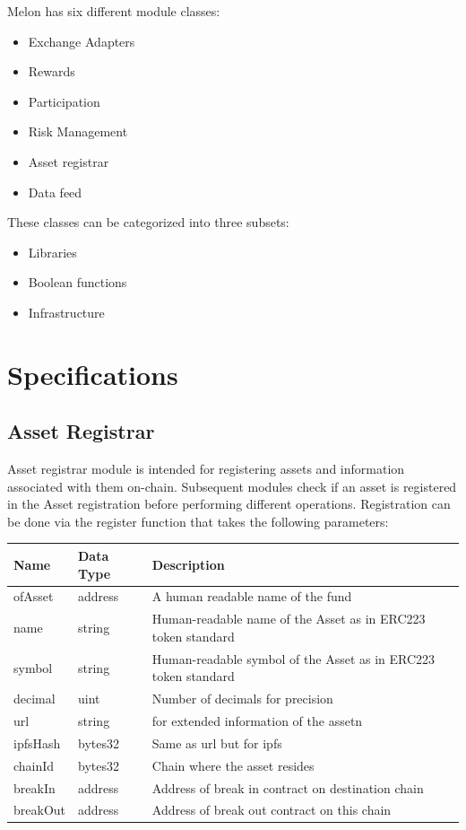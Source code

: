 \documentclass[conference]{IEEEtran}
\begin{document}
Melon has six different module classes:

\begin{itemize}
  \item Exchange Adapters
  \item Rewards
  \item Participation
  \item Risk Management
  \item Asset registrar
  \item Data feed
\end{itemize}

These classes can be categorized into three subsets:

\begin{itemize}
  \item Libraries
  \item Boolean functions
  \item Infrastructure
\end{itemize}

\section{Specifications}

\subsection{Asset Registrar}

Asset registrar module is intended for registering assets and information associated with them on-chain. Subsequent modules check if an asset is registered in the Asset registration before performing different operations. Registration can be done via the register function that takes the following parameters:

\begin{center}
	\footnotesize
	\begin{tabular}{ | p{2.7cm} | p{0.8cm} | p{4cm} | }
		\hline
		Name & Data Type & Description \\ \hline
		ofAsset & address & A human readable name of the fund \\ \hline
		name & string & Human-readable name of the Asset as in ERC223 token standard \\ \hline
		symbol & string & Human-readable symbol of the Asset as in ERC223 token standard \\ \hline
		decimal & uint & Number of decimals for precision \\ \hline
		url & string & for extended information of the assetn \\ \hline
		ipfsHash & bytes32 & Same as url but for ipfs \\ \hline
		chainId & bytes32 & Chain where the asset resides \\ \hline
		breakIn & address & Address of break in contract on destination chain \\ \hline
		breakOut & address & Address of break out contract on this chain \\ \hline
	\end{tabular}
\end{center}
\end{document}
